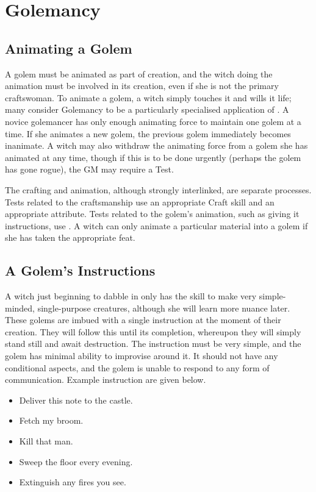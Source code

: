 \chapter{Golemancy}

\section{Animating a Golem}

A golem must be animated as part of creation, and the witch doing the animation must be involved in its creation, even if she is not the primary craftswoman.
To animate a golem, a witch simply touches it and wills it life; many consider Golemancy to be a particularly specialised application of .
A novice golemancer has only enough animating force to maintain one golem at a time.
If she animates a new golem, the previous golem immediately becomes inanimate.
A witch may also withdraw the animating force from a golem she has animated at any time, though if this is to be done urgently (perhaps the golem has gone rogue), the GM may require a Test.

The crafting and animation, although strongly interlinked, are separate processes.
Tests related to the craftsmanship use an appropriate Craft skill and an appropriate attribute.
Tests related to the golem's animation, such as giving it instructions, use .
A witch can only animate a particular material into a golem if she has taken the appropriate feat.

\section{A Golem's Instructions}

A witch just beginning to dabble in  only has the skill to make very simple-minded, single-purpose creatures, although she will learn more nuance later.
These golems are imbued with a single instruction at the moment of their creation.
They will follow this until its completion, whereupon they will simply stand still and await destruction.
The instruction must be very simple, and the golem has minimal ability to improvise around it.
It should not have any conditional aspects, and the golem is unable to respond to any form of communication.
Example instruction are given below.

\begin{itemize}
	\item Deliver this note to the castle.
	\item Fetch my broom.
	\item Kill that man.
	\item Sweep the floor every evening.
	\item Extinguish any fires you see.
\end{itemize}

